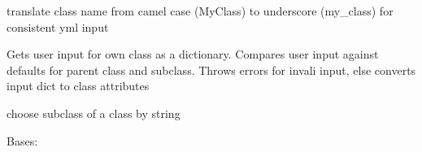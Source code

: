 \documentclass[letterpaper,10pt,english]{sphinxmanual}
\begin{document}
\begin{fulllineitems}
\begin{fulllineitems}
\end{fulllineitems}


\begin{fulllineitems}
\label{\detokenize{helpers:helpers.baseclass.BaseClass.name}}
translate class name from camel case (MyClass) to 
underscore (my\_class) for consistent yml input

\end{fulllineitems}


\begin{fulllineitems}
\label{\detokenize{helpers:helpers.baseclass.BaseClass.read_prms}}
Gets user input for own class as a dictionary.
Compares user input against defaults for parent class and 
subclass. Throws errors for invali input, else converts input 
dict to class attributes

\end{fulllineitems}


\begin{fulllineitems}
\label{\detokenize{helpers:helpers.baseclass.BaseClass.subclass}}
choose subclass of a class by string

\end{fulllineitems}


\end{fulllineitems}


\begin{fulllineitems}
\label{\detokenize{helpers:helpers.baseclass.InputPrmError}}
Bases: 

\end{fulllineitems}
\end{document}
